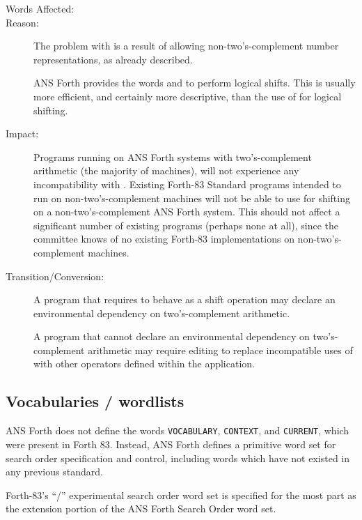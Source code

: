 \begin{description}
\item[Words Affected:]

\item[Reason:]
	The problem with  is a result of allowing
	non-two's-complement number representations, as already
	described.

	ANS Forth provides the words  and 
	to perform logical shifts. This is usually more efficient, and
	certainly more descriptive, than the use of  for
	logical shifting.

\item[Impact:]
	Programs running on ANS Forth systems with two's-complement
	arithmetic (the majority of machines), will not experience any
	incompatibility with . Existing Forth-83 Standard
	programs intended to run on non-two's-complement machines will
	not be able to use  for shifting on a
	non-two's-complement ANS Forth system. This should not affect
	a significant number of existing programs (perhaps none at all),
	since the committee knows of no existing Forth-83 implementations
	on non-two's-complement machines.

\item[Transition/Conversion:]
	A program that requires  to behave as a shift
	operation may declare an environmental dependency on
	two's-complement arithmetic.

	A program that cannot declare an environmental dependency on
	two's-complement arithmetic may require editing to replace
	incompatible uses of  with other operators defined
	within the application.
\end{description}

\subsection{Vocabularies / wordlists} %

ANS Forth does not define the words \texttt{VOCABULARY},
\texttt{CONTEXT}, and \texttt{CURRENT}, which were present in
Forth 83. Instead, ANS Forth defines a primitive word set for
search order specification and control, including words which have
not existed in any previous standard.

Forth-83's ``/'' experimental
search order word set is specified for the most part as the extension
portion of the ANS Forth Search Order word set.

